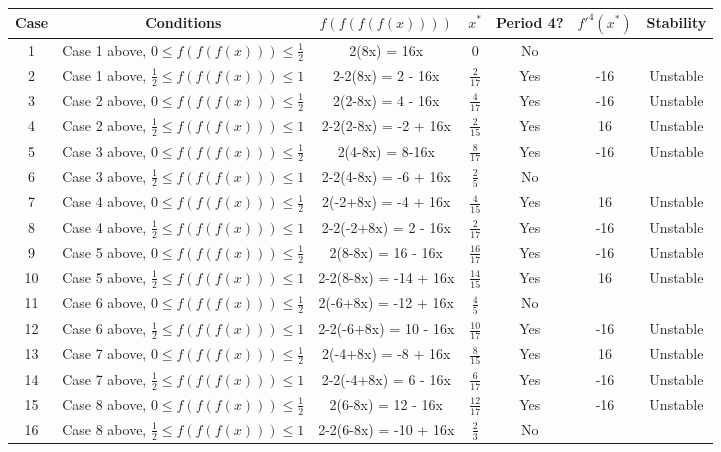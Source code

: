 \documentclass[12pt]{article}
\begin{document}
\begin{table}[h!]
  \centering
  \begin{tabular}{c|c||c|c|c|c|c}
    Case &Conditions & $f(f(f(f(x))))$ & $x^*$ & Period 4? & $f'^4(x^*)$ & Stability\\
    \hline
    1&Case 1 above, $0\leq f(f(f(x))) \leq \frac{1}{2}$  & 2(8x) = 16x & 0 & No & & \\
    2&Case 1 above, $\frac{1}{2} \leq f(f(f(x))) \leq 1$  & 2-2(8x) = 2 - 16x & $\frac{2}{17}$ & Yes &-16 & Unstable\\
    3&Case 2 above, $0\leq f(f(f(x))) \leq \frac{1}{2}$  & 2(2-8x) = 4 - 16x & $\frac{4}{17}$ & Yes &-16 & Unstable \\
    4&Case 2 above, $\frac{1}{2} \leq f(f(f(x))) \leq 1$  & 2-2(2-8x) = -2 + 16x & $\frac{2}{15}$ & Yes &16 & Unstable\\
    5&Case 3 above, $0\leq f(f(f(x))) \leq \frac{1}{2}$  & 2(4-8x) = 8-16x &$\frac{8}{17}$ & Yes &-16 & Unstable \\
    6&Case 3 above, $\frac{1}{2} \leq f(f(f(x))) \leq 1$  & 2-2(4-8x) = -6 + 16x & $\frac{2}{5}$ & No & &\\
    7&Case 4 above, $0\leq f(f(f(x))) \leq \frac{1}{2}$  & 2(-2+8x) = -4 + 16x & $\frac{4}{15}$ & Yes &16 & Unstable\\
    8&Case 4 above, $\frac{1}{2} \leq f(f(f(x))) \leq 1$  & 2-2(-2+8x) = 2 - 16x & $\frac{2}{17}$ & Yes &-16 & Unstable\\
    9&Case 5 above, $0\leq f(f(f(x))) \leq \frac{1}{2}$  & 2(8-8x) = 16 - 16x & $\frac{16}{17}$ & Yes &-16 & Unstable\\
    10&Case 5 above, $\frac{1}{2} \leq f(f(f(x))) \leq 1$  & 2-2(8-8x) = -14 + 16x & $\frac{14}{15}$ & Yes &16 & Unstable\\
    11&Case 6 above, $0\leq f(f(f(x))) \leq \frac{1}{2}$  & 2(-6+8x) = -12 + 16x & $\frac{4}{5}$ & No & & \\
    12&Case 6 above, $\frac{1}{2} \leq f(f(f(x))) \leq 1$  & 2-2(-6+8x) = 10 - 16x & $\frac{10}{17}$ & Yes &-16 & Unstable\\
    13&Case 7 above, $0\leq f(f(f(x))) \leq \frac{1}{2}$  & 2(-4+8x) = -8 + 16x & $\frac{8}{15}$ & Yes &16 & Unstable\\
    14&Case 7 above, $\frac{1}{2} \leq f(f(f(x))) \leq 1$  & 2-2(-4+8x) = 6 - 16x & $\frac{6}{17}$ & Yes &-16 & Unstable\\
    15&Case 8 above, $0\leq f(f(f(x))) \leq \frac{1}{2}$  & 2(6-8x) = 12 - 16x & $\frac{12}{17}$ & Yes &-16 & Unstable\\
    16&Case 8 above, $\frac{1}{2} \leq f(f(f(x))) \leq 1$  & 2-2(6-8x) = -10 + 16x & $\frac{2}{3}$ & No & & \\
  \end{tabular}
\end{table}\\
\end{document}
